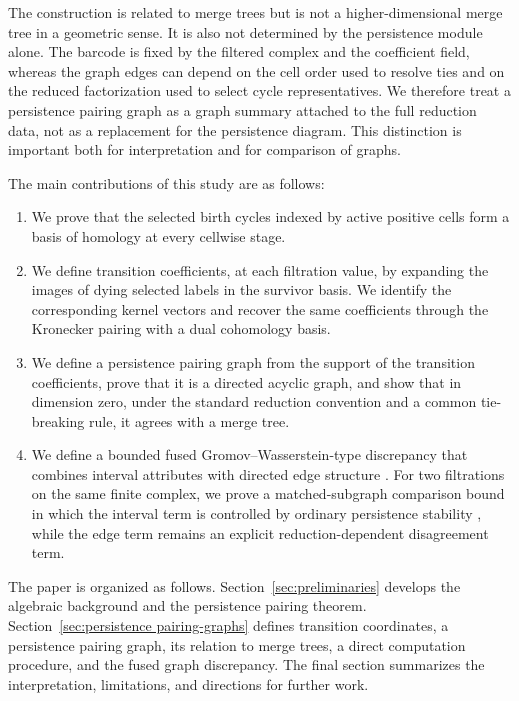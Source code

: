\documentclass[11pt]{article}
\theoremstyle{paperdefinition}
\theoremstyle{paperplain}
\theoremstyle{paperremark}
\begin{document}
The construction is related to merge trees but is not a higher-dimensional merge tree in a geometric sense. It is also not determined by the persistence module alone. The barcode is fixed by the filtered complex and the coefficient field, whereas the graph edges can depend on the cell order used to resolve ties and on the reduced factorization used to select cycle representatives. We therefore treat a persistence pairing graph as a graph summary attached to the full reduction data, not as a replacement for the persistence diagram. This distinction is important both for interpretation and for comparison of graphs.

The main contributions of this study are as follows:
\begin{enumerate}
\item We prove that the selected birth cycles indexed by active positive cells form a basis of homology at every cellwise stage.

\item We define transition coefficients, at each filtration value, by expanding the images of dying selected labels in the survivor basis. We identify the corresponding kernel vectors and recover the same coefficients through the Kronecker pairing with a dual cohomology basis.

\item We define a persistence pairing graph from the support of the transition coefficients, prove that it is a directed acyclic graph, and show that in dimension zero, under the standard reduction convention and a common tie-breaking rule, it agrees with a merge tree.

\item We define a bounded fused Gromov--Wasserstein-type discrepancy that combines interval attributes with directed edge structure \cite{vayer2020fused}. For two filtrations on the same finite complex, we prove a matched-subgraph comparison bound in which the interval term is controlled by ordinary persistence stability \cite{cohensteiner2007stability}, while the edge term remains an explicit reduction-dependent disagreement term.
\end{enumerate}

The paper is organized as follows. Section~\ref{sec:preliminaries} develops the algebraic background and the persistence pairing theorem. Section~\ref{sec:persistence pairing-graphs} defines transition coordinates, a persistence pairing graph, its relation to merge trees, a direct computation procedure, and the fused graph discrepancy. The final section summarizes the interpretation, limitations, and directions for further work.
\end{document}
